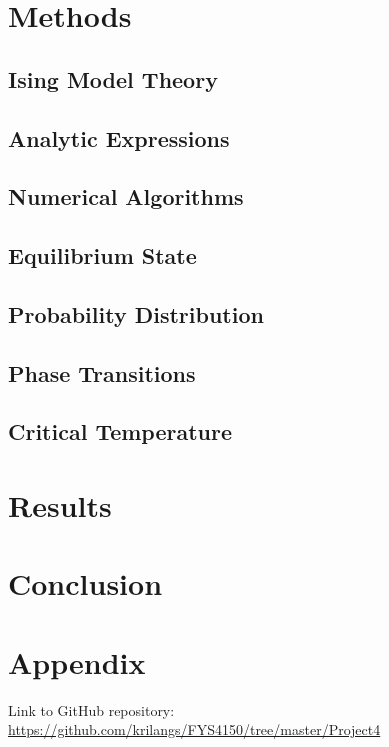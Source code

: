 \documentclass[12pt,a4paper,english]{article}
\begin{document}
\section{Methods}
\label{sect:Methods}
\subsection{Ising Model Theory}
\label{subsect:Ising}
\subsection{Analytic Expressions}
\label{subsect:analytic}
\subsection{Numerical Algorithms}
\label{subsect:Algo}
\subsection{Equilibrium State}
\label{subsect:Equilibrium}
\subsection{Probability Distribution}
\label{subsect:Prob_dist}
\subsection{Phase Transitions}
\label{subsect:Phase_trans}
\subsection{Critical Temperature}
\label{subsect:TC}
\section{Results}
\section{Conclusion}
\appendix
\section{Appendix}
\label{sect:appendix}
Link to GitHub repository:\\
\url{https://github.com/krilangs/FYS4150/tree/master/Project4}



\end{document}
